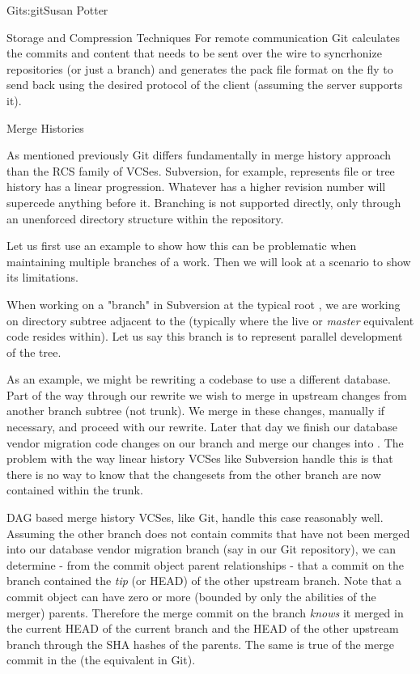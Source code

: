 \begin{aosachapter}{Git}{s:git}{Susan Potter}
\begin{aosasect1}{Storage and Compression Techniques}
For remote communication Git calculates the commits and content that needs
to be sent over the wire to syncrhonize repositories (or just a branch) and
generates the pack file format on the fly to send back using the desired
protocol of the client (assuming the server supports it).

\end{aosasect1}

\begin{aosasect1}{Merge Histories}

As mentioned previously Git differs fundamentally in merge history approach
than the RCS family of VCSes. Subversion, for example, represents
file or tree history has a linear progression. Whatever has a higher revision
number will supercede anything before it. Branching is not supported directly,
only through an unenforced directory structure within the repository.

Let us first use an example to show how this can be problematic when
maintaining multiple branches of a work. Then we will look at a scenario to
show its limitations.

When working on a "branch" in Subversion at the typical root
, we are working on directory subtree adjacent to
the  (typically where the live or \emph{master} equivalent code
resides within). Let us say this branch is to represent parallel development
of the  tree.

As an example,
we might be rewriting a codebase to use a different database. Part of the
way through our rewrite we wish to merge in upstream changes from another
branch subtree (not trunk). We merge in these changes, manually if necessary,
and proceed with our rewrite. Later that day we finish our database vendor
migration code changes on our  branch and merge
our changes into . The problem with the way linear history VCSes
like Subversion handle this is that there is no way to know that the
changesets from the other branch are now contained within the trunk.

DAG based merge history VCSes, like Git, handle this case reasonably well.
Assuming the other branch does not contain commits that have not been merged
into our database vendor migration branch (say  in our
Git repository), we can determine - from the commit object parent
relationships - that a commit on the  branch contained
the \emph{tip} (or HEAD) of the other upstream branch. Note that a commit
object can have zero or more (bounded by only the abilities of the merger)
parents. Therefore the merge commit on the  branch
\emph{knows} it merged in the current HEAD of the current branch and the
HEAD of the other upstream branch through the SHA hashes of the parents.
The same is true of the merge commit in the  (the 
equivalent in Git).


\end{aosasect1}
\end{aosachapter}
